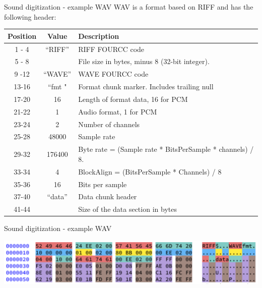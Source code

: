 \begin{frame}{Sound digitization - example WAV}
  WAV is a format based on RIFF and has the following header:
  \begin{center}
  \fontsize{8}{9}\selectfont
  \begin{tabularx}{13cm}{c|c|X}
    Position & Value & Description \\
    \hline
    1 - 4 & “RIFF” & RIFF FOURCC code \\
    5 - 8 &  & File size in bytes, minus 8 (32-bit integer). \\
    9 -12 & “WAVE” & WAVE FOURCC code \\
    13-16 & “fmt " & Format chunk marker. Includes trailing null \\
    17-20 & 16 & Length of format data, 16 for PCM \\
    21-22 & 1 & Audio format, 1 for PCM \\
    23-24 & 2 & Number of channels \\
    25-28 & 48000 & Sample rate \\
    29-32 & 176400 & Byte rate = (Sample rate * BitsPerSample * channels) / 8. \\
    33-34 & 4 & BlockAlign = (BitsPerSample * Channels) / 8 \\
    35-36 & 16 & Bits per sample \\
    37-40 & “data” & Data chunk header \\
    41-44 &  & Size of the data section in bytes \\
  \end{tabularx}
  \end{center}
\end{frame}

\begin{frame}{Sound digitization - example WAV}
  \begin{center}
  \includegraphics[width=\textwidth]{slides/audio-sound/RIFF_WAVE.png}
  \end{center}
\end{frame}


